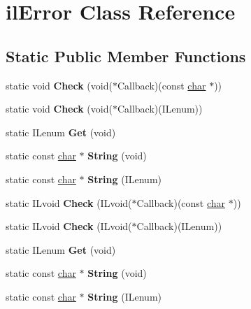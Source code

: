 \hypertarget{classilError}{}\section{il\+Error Class Reference}
\label{classilError}
\subsection*{Static Public Member Functions}
\begin{DoxyCompactItemize}
\item 
\mbox{\label{classilError_ae7556160b0965531f1c510b9b2a6e80f}} 
static void {\bfseries Check} (void($\ast$Callback)(const \hyperlink{classchar}{char} $\ast$))
\item 
\mbox{\label{classilError_a05ac0283a2eec26ec51545e89284681d}} 
static void {\bfseries Check} (void($\ast$Callback)(I\+Lenum))
\item 
\mbox{\label{classilError_afee50798c8926f282fb48c5768faf0a9}} 
static I\+Lenum {\bfseries Get} (void)
\item 
\mbox{\label{classilError_a9c160254954e184e30846d5ae1014139}} 
static const \hyperlink{classchar}{char} $\ast$ {\bfseries String} (void)
\item 
\mbox{\label{classilError_a6e296f599ac39e14bd6824df9bb024fb}} 
static const \hyperlink{classchar}{char} $\ast$ {\bfseries String} (I\+Lenum)
\item 
\mbox{\label{classilError_a13f846787d3805ce416474d130d5783a}} 
static I\+Lvoid {\bfseries Check} (I\+Lvoid($\ast$Callback)(const \hyperlink{classchar}{char} $\ast$))
\item 
\mbox{\label{classilError_a6bd14a9274a0d11e2ca7d3ef4c692143}} 
static I\+Lvoid {\bfseries Check} (I\+Lvoid($\ast$Callback)(I\+Lenum))
\item 
\mbox{\label{classilError_abc8609aeeccf03fd651a83775c871821}} 
static I\+Lenum {\bfseries Get} (void)
\item 
\mbox{\label{classilError_a28207cbcb6684824f5af493ae4996d19}} 
static const \hyperlink{classchar}{char} $\ast$ {\bfseries String} (void)
\item 
\mbox{\label{classilError_a34ea6adf752c57d85d607eefec2b58c8}} 
static const \hyperlink{classchar}{char} $\ast$ {\bfseries String} (I\+Lenum)
\end{DoxyCompactItemize}


